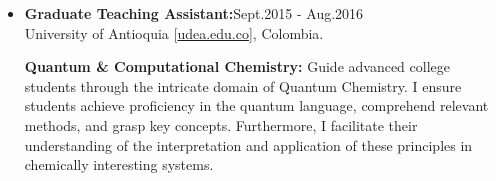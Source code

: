 \begin{itemize}
    \item {\bf Graduate Teaching Assistant:}\hfill \textcolor{my_blue}{Sept.2015 - Aug.2016}\\
          University of Antioquia [\href{www.udea.edu.co}{udea.edu.co}],
          Colombia.

              {\noindent
                  \textbf{Quantum \& Computational Chemistry:}
                  Guide advanced college students through the intricate domain of Quantum Chemistry. I ensure students achieve proficiency in the quantum language, comprehend relevant methods, and grasp key concepts. Furthermore, I facilitate their understanding of the interpretation and application of these principles in chemically interesting systems.
              }

\end{itemize}
